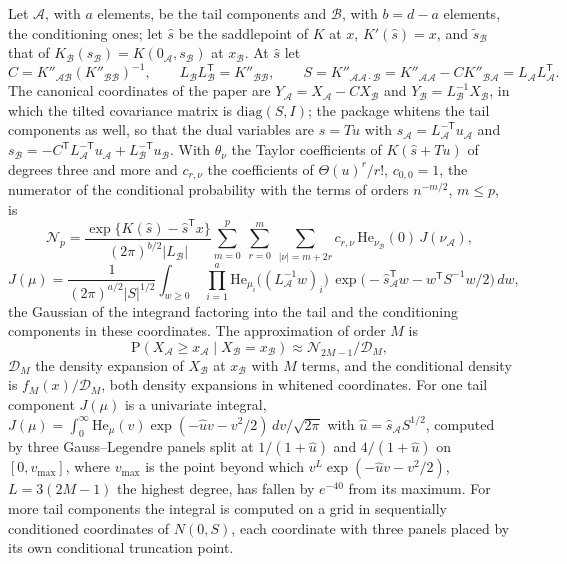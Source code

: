 \documentclass[11pt]{article}
\newcommand{\tp}{^{\mathsf T}}
\newcommand{\He}{\mathrm{He}}
\newcommand{\pr}{\mathrm{P}}
\begin{document}
Let $\mathcal A$, with $a$ elements, be the tail components and $\mathcal B$, with $b=d-a$
elements, the conditioning ones; let $\hat s$ be the saddlepoint of $K$ at $x$, $K'(\hat s)=x$, and
$\tilde s_{\mathcal B}$ that of $K_{\mathcal B}(s_{\mathcal B})=K(0_{\mathcal A},s_{\mathcal B})$ at
$x_{\mathcal B}$. At $\hat s$ let
\[
C=K''_{\mathcal{AB}}(K''_{\mathcal{BB}})^{-1},\qquad L_{\mathcal B}L_{\mathcal B}\tp=K''_{\mathcal{BB}},\qquad
S=K''_{\mathcal{AA}\cdot\mathcal B}=K''_{\mathcal{AA}}-CK''_{\mathcal{BA}}=L_{\mathcal A}L_{\mathcal A}\tp.
\]
The canonical coordinates of the paper are $Y_{\mathcal A}=X_{\mathcal A}-CX_{\mathcal B}$ and
$Y_{\mathcal B}=L_{\mathcal B}^{-1}X_{\mathcal B}$, in which the tilted covariance matrix is
$\mathrm{diag}(S,I)$; the package whitens the tail components as well, so that the dual variables
are $s=Tu$ with $s_{\mathcal A}=L_{\mathcal A}^{-\mathsf T}u_{\mathcal A}$ and
$s_{\mathcal B}=-C\tp L_{\mathcal A}^{-\mathsf T}u_{\mathcal A}+L_{\mathcal B}^{-\mathsf T}u_{\mathcal B}$.
With $\theta_\nu$ the Taylor coefficients of $K(\hat s+Tu)$ of degrees three and more and $c_{r,\nu}$
the coefficients of $\Theta(u)^r/r!$, $c_{0,0}=1$, the numerator of the conditional probability with
the terms of orders $n^{-m/2}$, $m\leq p$, is
\[
\mathcal N_p=\frac{\exp\{K(\hat s)-\hat s\tp x\}}{(2\pi)^{b/2}|L_{\mathcal B}|}\sum_{m=0}^{p}\ \sum_{r=0}^{m}\ \sum_{|\nu|=m+2r}c_{r,\nu}\,\He_{\nu_{\mathcal B}}(0)\,J(\nu_{\mathcal A}),
\]
\[
J(\mu)=\frac{1}{(2\pi)^{a/2}|S|^{1/2}}\int_{w\geq0}\ \prod_{i=1}^{a}\He_{\mu_i}\bigl((L_{\mathcal A}^{-1}w)_i\bigr)\,
\exp\bigl(-\hat s_{\mathcal A}\tp w-w\tp S^{-1}w/2\bigr)\,dw,
\]
the Gaussian of the integrand factoring into the tail and the conditioning components in these
coordinates. The approximation of order $M$ is
\[
\pr(X_{\mathcal A}\geq x_{\mathcal A}\mid X_{\mathcal B}=x_{\mathcal B})\approx\mathcal N_{2M-1}/\mathcal D_M,
\]
$\mathcal D_M$ the density expansion of $X_{\mathcal B}$ at $x_{\mathcal B}$ with $M$ terms, and the
conditional density is $f_M(x)/\mathcal D_M$, both density expansions in whitened coordinates. For
one tail component $J(\mu)$ is a univariate integral, $J(\mu)=\int_0^\infty\He_\mu(v)
\exp(-\hat uv-v^2/2)\,dv/\sqrt{2\pi}$ with $\hat u=\hat s_{\mathcal A}S^{1/2}$, computed by three
Gauss--Legendre panels split at $1/(1+\hat u)$ and $4/(1+\hat u)$ on $[0,v_{\max}]$, where $v_{\max}$
is the point beyond which $v^L\exp(-\hat uv-v^2/2)$, $L=3(2M-1)$ the highest degree, has fallen by
$e^{-40}$ from its maximum. For more tail components the integral is computed on a grid in
sequentially conditioned coordinates of $N(0,S)$, each coordinate with three panels placed by its
own conditional truncation point.
\end{document}
